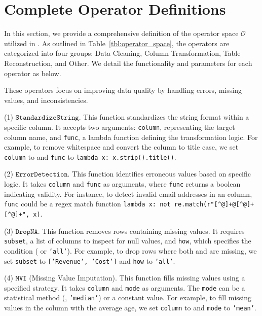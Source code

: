 \appendix



\section{Complete Operator Definitions}
\label{sec:appendix_operators}

In this section, we provide a comprehensive definition of the operator space $\mathcal{O}$ utilized in \sys. As outlined in Table~\ref{tbl:operator_space}, the operators are categorized into four groups: Data Cleaning, Column Transformation, Table Reconstruction, and Other. We detail the functionality and parameters for each operator as below.

These operators focus on improving data quality by handling errors, missing values, and inconsistencies.

(1) $\mathtt{StandardizeString}$.
    This function standardizes the string format within a specific column. It accepts two arguments: {\small\texttt{column}}, representing the target column name, and {\small\texttt{func}}, a lambda function defining the transformation logic. For example, to remove whitespace and convert the  column to title case, we set {\small\texttt{column}} to  and {\small\texttt{func}} to {\small\texttt{lambda x: x.strip().title()}}.

(2) $\mathtt{ErrorDetection}$.
    This function identifies erroneous values based on specific logic. It takes {\small\texttt{column}} and {\small\texttt{func}} as arguments, where {\small\texttt{func}} returns a boolean indicating validity. For instance, to detect invalid email addresses in an  column, {\small\texttt{func}} could be a regex match function {\small\texttt{lambda x: not re.match(r"[\^{}@]+@[\^{}@]+\.[\^{}@]+", x)}}.

(3) $\mathtt{DropNA}$.
    This function removes rows containing missing values. It requires {\small\texttt{subset}}, a list of columns to inspect for null values, and {\small\texttt{how}}, which specifies the condition ( or {\small\texttt{'all'}}). For example, to drop rows where both  and  are missing, we set {\small\texttt{subset}} to {\small\texttt{['Revenue', 'Cost']}} and {\small\texttt{how}} to {\small\texttt{'all'}}.

(4) $\mathtt{MVI}$ (Missing Value Imputation).
    This function fills missing values using a specified strategy. It takes {\small\texttt{column}} and {\small\texttt{mode}} as arguments. The {\small\texttt{mode}} can be a statistical method (, {\small\texttt{'median'}}) or a constant value. For example, to fill missing values in the  column with the average age, we set {\small\texttt{column}} to  and {\small\texttt{mode}} to {\small\texttt{'mean'}}.

